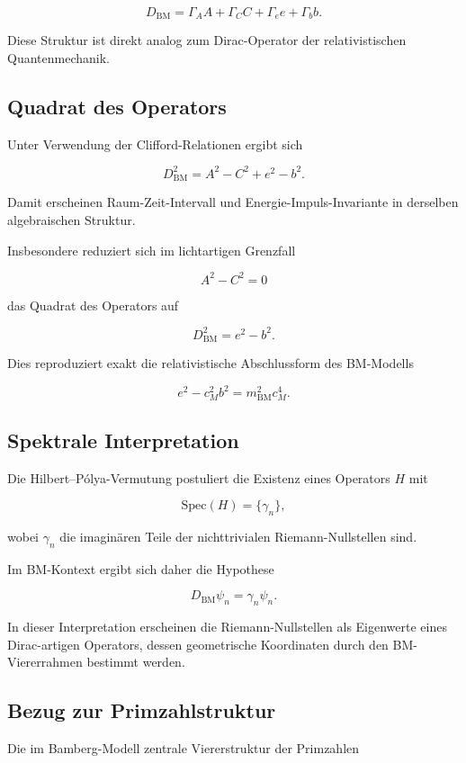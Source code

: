 \documentclass[11pt,a4paper]{article}
\theoremstyle{definition}
\theoremstyle{plain}
\begin{document}
	\[
	D_{\mathrm{BM}} =
	\Gamma_A A +
	\Gamma_C C +
	\Gamma_e e +
	\Gamma_b b .
	\]
	
	Diese Struktur ist direkt analog zum Dirac-Operator der relativistischen
	Quantenmechanik.
	
	\subsection{Quadrat des Operators}
	
	Unter Verwendung der Clifford-Relationen ergibt sich
	
	\[
	D_{\mathrm{BM}}^2 =
	A^2 - C^2 + e^2 - b^2 .
	\]
	
	Damit erscheinen Raum-Zeit-Intervall und Energie-Impuls-Invariante
	in derselben algebraischen Struktur.
	
	Insbesondere reduziert sich im lichtartigen Grenzfall
	
	\[
	A^2 - C^2 = 0
	\]
	
	das Quadrat des Operators auf
	
	\[
	D_{\mathrm{BM}}^2 = e^2 - b^2 .
	\]
	
	Dies reproduziert exakt die relativistische Abschlussform des
	BM-Modells
	
	\[
	e^2 - c_M^2 b^2 = m_{\mathrm{BM}}^2 c_M^4 .
	\]
	
	\subsection{Spektrale Interpretation}
	
	Die Hilbert--Pólya-Vermutung postuliert die Existenz eines Operators
	$H$ mit
	
	\[
	\mathrm{Spec}(H) = \{\gamma_n\},
	\]
	
	wobei $\gamma_n$ die imaginären Teile der nichttrivialen
	Riemann-Nullstellen sind.
	
	Im BM-Kontext ergibt sich daher die Hypothese
	
	\[
	D_{\mathrm{BM}}\psi_n = \gamma_n \psi_n .
	\]
	
	In dieser Interpretation erscheinen die Riemann-Nullstellen als
	Eigenwerte eines Dirac-artigen Operators, dessen geometrische
	Koordinaten durch den BM-Viererrahmen bestimmt werden.
	
	\subsection{Bezug zur Primzahlstruktur}
	
	Die im Bamberg-Modell zentrale Viererstruktur der Primzahlen
	
\end{document}
